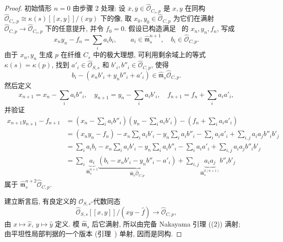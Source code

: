 \begin{proof}
初始情形 $n=0$ 由步骤 2 处理: 设 $\overline x,\allowbreak \overline y\in\widehat{\mathcal O}_{C_s,\allowbreak p}$ 是 $x,\allowbreak y$ 在同构 $\widehat{\mathcal O}_{C_s,\allowbreak p}\cong\kappa(s)[[x,\allowbreak y]]/(xy)$ 下的像, 取 $x_0,\allowbreak y_0\in\widehat{\mathcal O}_{C,\allowbreak p}$ 为它们在满射 $\widehat{\mathcal O}_{C,\allowbreak p}\to\widehat{\mathcal O}_{C_s,\allowbreak p}$ 下的任意提升, 并令 $f_0=0$. 假设已构造满足~ 的 $x_n,\allowbreak y_n,\allowbreak f_n$, 写成
\[
x_ny_n-f_n=\sum_i a_i b_i,\qquad a_i\in\widehat{\mathfrak m}_s^{n+1},\quad b_i\in\widehat{\mathcal O}_{C,p}.
\]
由于 $x_n,\allowbreak y_n$ 生成 $p$ 在纤维 $C_s$ 中的极大理想, 可利用剩余域上的等式 $\kappa(s)=\kappa(p)$, 找到 $a'_i\in\widehat{\mathcal O}_{S,\allowbreak s}$ 和 $b'_i,\allowbreak b''_i\in\widehat{\mathcal O}_{C,\allowbreak p}$, 使得
\[
b_i-(x_nb'_i+y_nb''_i+a'_i)\in\widehat{\mathfrak m}_s\widehat{\mathcal O}_{C,p}.
\]
然后定义
\[
x_{n+1}=x_n-\sum_i a_i b''_i,\quad y_{n+1}=y_n-\sum_i a_i b'_i,\quad f_{n+1}=f_n+\sum_i a_i a'_i,
\]
并验证
\[
\begin{aligned}
x_{n+1}y_{n+1}-f_{n+1}
&=(x_n-\sum_i a_i b''_i)(y_n-\sum_i a_i b'_i)-(f_n+\sum_i a_i a'_i)\\
&=(x_ny_n-f_n)-x_n\sum_i a_i b'_i-y_n\sum_i a_i b''_i-\sum_i a_i a'_i+\sum_{i,j}a_i a_j b''_i b'_j\\
&=\sum_i a_i b_i-x_n\sum_i a_i b'_i-y_n\sum_i a_i b''_i-\sum_i a_i a'_i+\sum_{i,j}a_i a_j b''_i b'_j\\
&=\sum_i\underbrace{a_i}_{\widehat{\mathfrak m}_s^{n+1}}\underbrace{(b_i-x_nb'_i-y_nb''_i-a'_i)}_{\widehat{\mathfrak m}_s\widehat{\mathcal O}_{C,p}}+\sum_{i,j}\underbrace{a_i a_j}_{\widehat{\mathfrak m}_s^{2(n+1)}}b''_i b'_j
\end{aligned}
\]
属于 $\widehat{\mathfrak m}_s^{n+2}\widehat{\mathcal O}_{C,\allowbreak p}$.

建立断言后, 有良定义的 $\mathcal O_{S,\allowbreak s}$-代数同态
\[
\widehat{\mathcal O}_{S,s}[[x,y]]/(xy-\widehat f)\to\widehat{\mathcal O}_{C,p},
\]
由 $x\mapsto\widehat x$, $y\mapsto\widehat y$ 定义. 模 $\widehat{\mathfrak m}_s$ 后它满射, 所以由完备 Nakayama 引理 ((2)) 满射; 由平坦性局部判据的一个版本 (引理~) 单射, 因而是同构.


\end{proof}
